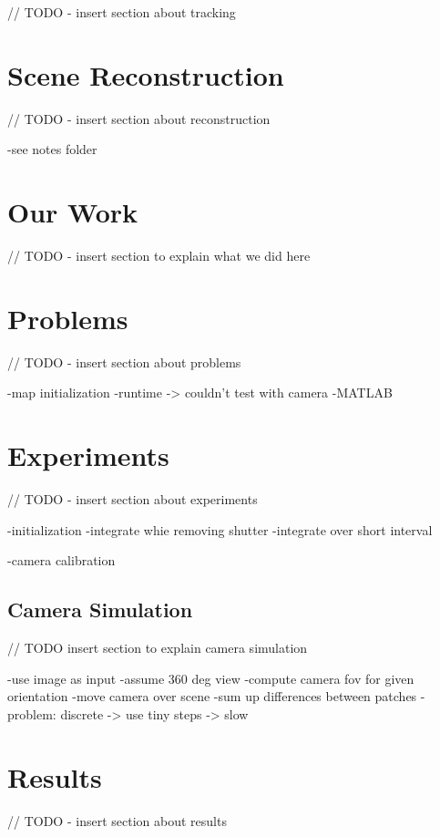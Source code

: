 \documentclass[10pt,twocolumn,letterpaper]{article}
\begin{document}
// TODO - insert section about tracking

\section{Scene Reconstruction}

// TODO - insert section about reconstruction

-see notes folder



\section{Our Work}

// TODO - insert section to explain what we did here

\section{Problems}

// TODO - insert section about problems

-map initialization
-runtime
-> couldn't test with camera
-MATLAB


\section{Experiments}

// TODO - insert section about experiments

-initialization
	-integrate whie removing shutter
	-integrate over short interval
	
-camera calibration

\subsection{Camera Simulation}

// TODO insert section to explain camera simulation

-use image as input
-assume 360 deg view
-compute camera fov for given orientation
-move camera over scene
-sum up differences between patches
-problem: discrete
	-> use tiny steps
		-> slow

\section{Results}

// TODO - insert section about results


{\small


}
\end{document}
